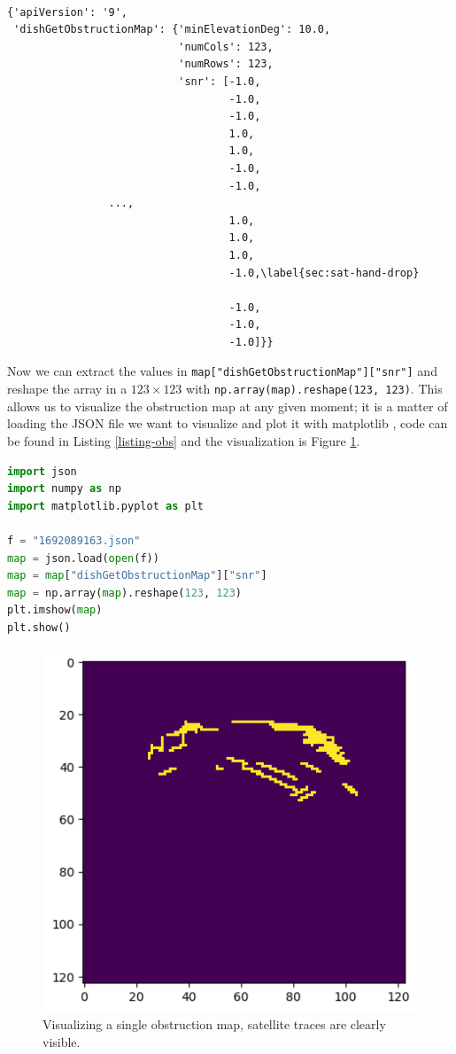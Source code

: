 \documentclass[IN,11pt,twoside,openright,idp,english]{tumthesis}
\begin{document}
\begin{lstlisting}[caption={data from the \texttt{dish\_get\_obstruction\_map} function},captionpos=b]

{'apiVersion': '9',
 'dishGetObstructionMap': {'minElevationDeg': 10.0,
                           'numCols': 123,
                           'numRows': 123,
                           'snr': [-1.0,
                                   -1.0,
                                   -1.0,
                                   1.0,
                                   1.0,
                                   -1.0,
                                   -1.0,
                ...,
                                   1.0,
                                   1.0,
                                   1.0,
                                   -1.0,\label{sec:sat-hand-drop}

                                   -1.0,
                                   -1.0,
                                   -1.0]}}  
\end{lstlisting}

Now we can extract the values in \texttt{map["dishGetObstructionMap"]["snr"]} and reshape the array in a $123\times123$ with \texttt{np.array(map).reshape(123, 123)}. This allows us to visualize the obstruction map at any given moment; it is a matter of loading the JSON file we want to visualize and plot it with matplotlib \cite{Hunter:2007}, code can be found in Listing \ref{listing-obs} and the visualization is Figure \ref{fig:vis-single-map}.

\begin{lstlisting}[language=python,caption={visualizing a single obstruction map},captionpos=b,label=listing-obs]
import json
import numpy as np
import matplotlib.pyplot as plt

f = "1692089163.json"
map = json.load(open(f))
map = map["dishGetObstructionMap"]["snr"]
map = np.array(map).reshape(123, 123)
plt.imshow(map)
plt.show()
\end{lstlisting}

\begin{figure}
    \centering
    \includegraphics[width=0.5\columnwidth]{img/single_map.png}
    \caption{Visualizing a single obstruction map, satellite traces are clearly visible.}
    \label{fig:vis-single-map}
\end{figure}
\end{document}
